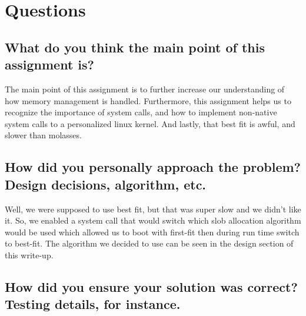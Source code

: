 \documentclass[onecolumn, draftclsnofoot,10pt, compsoc]{IEEEtran}
\begin{document}
\section{Questions}
\subsection{What do you think the main point of this assignment is?}
The main point of this assignment is to further increase our understanding of how memory management is handled. Furthermore, this assignment helps us to recognize the importance of system calls, and how to implement non-native system calls to a personalized linux kernel. And lastly, that best fit is awful, and slower than molasses.

\subsection{How did you personally approach the problem? Design decisions, algorithm, etc.}
Well, we were supposed to use best fit, but that was super slow and we didn’t like it. So, we enabled a system call that would switch which slob allocation algorithm would be used which allowed us to boot with first-fit then during run time switch to best-fit. The algorithm we decided to use can be seen in the design section of this write-up.

\subsection{How did you ensure your solution was correct? Testing details, for instance.}
\end{document}
